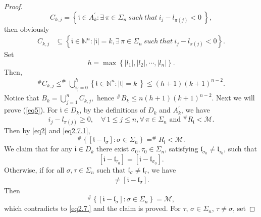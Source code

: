 \documentclass[10pt,a4paper]{amsart}
\begin{document}
\begin{proof}
		$$C_{k,j}=\left \{ \mathfrak{i}  \in A_{k}^{\prime}:\exists \, \pi \in \Sigma_{n} \ such \  that \  i_{j}-l_{\pi(j)}<0  \   \right \},$$
then obviously
$$ \begin{aligned}
		C_{k,j} & \subseteq   \left \{  \mathfrak{i}\in\mathbb N^n:    |\mathfrak{i}|=k, \exists \, \pi \in \Sigma_{n} \ such \  that \ i_{j}-l_{\pi(j)}<0  \right \}.
	\end{aligned} $$
Set
	\begin{equation}\label{eq6}
		h=\max \left \{ {\left | l_{1} \right | ,\left | l_{2} \right | ,\cdots ,\left | l_{n} \right |  } \right \}.
	\end{equation}
Then, 
	$$\begin{aligned}^{\#}C_{k,j}
	\leq	^{\#  } \bigcup\limits_{i_{j}=0}^{h} \left \{ \mathfrak{i} \in \mathbb{N}^n: |\mathfrak{i}|=k  \   \right \}  \leq \left ( h+1 \right ) \left ( k+1 \right ) ^{n-2}.
	\end{aligned}$$
 Notice that $B_{k}=\bigcup\limits_{j=1}^{n} C_{k,j},$ hence $^{\#  } B_{k}  \le n\left ( h+1 \right ) \left ( k+1 \right ) ^{n-2}$.
Next we will prove (\ref{eq5}). 
	For $ \mathfrak{i} \in D_{k}$, by the definitions of $D_{k}$ and  $A_{k}^{\prime}$, we have
\begin{equation}\label{eq2.7.1}
 i_{j}-l_{\pi(j)}\ge 0,\quad \forall \, 1\le j\le n ,  \forall \, \pi \in \Sigma_{n} \text{ and }  ^{\#  } R_{\mathfrak{i}  }   <\mathscr{M}. 
 \end{equation}
  Then by \eqref{eq2} and \eqref{eq2.7.1},
\begin{equation}\label{eq2.7.}
^{\#  }\left\{ [\mathfrak{i}-\mathfrak{l}_\sigma]:\sigma \in \Sigma_n \right\}= ^{\#  } R_{\mathfrak{i}  } <\mathscr{M}.
\end{equation}
We claim that for any $\mathfrak{i}\in D_k$ there exist $\sigma_{0}, \tau_{0} \in \Sigma_{n}$,  satisfying $\mathfrak{l}_{\sigma_0}\not=\mathfrak{l}_{\tau_0}$, such that
	\begin{equation}\label{eq2.8.}
		[\mathfrak{i}-\mathfrak{l}_{\tau_0}] = [\mathfrak{i}-\mathfrak{l}_{\sigma_0}].
	\end{equation}
Otherwise, if  for all
$\sigma, \tau \in \Sigma_{n}$ such that $\mathfrak{l}_{\sigma}\not=\mathfrak{l}_{\tau}$, we have
	\begin{eqnarray*}
[\mathfrak{i}-\mathfrak{l}_{\tau}]\not= [\mathfrak{i}-\mathfrak{l}_{\sigma}].
\end{eqnarray*}
Then
$$^{\#  }\left\{ [\mathfrak{i}-\mathfrak{l}_\sigma]:\sigma \in \Sigma_n \right\}= \mathscr{M},
$$
 which contradicts to \eqref{eq2.7.} and the claim is proved.	For $\tau$, $  \sigma \in \Sigma_{n}$, $\tau\not=\sigma$, set

\end{proof}
\end{document}
